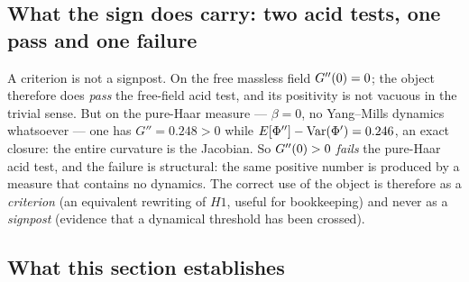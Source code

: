 
\subsection{What the sign does carry: two acid tests, one pass and one failure}

A criterion is not a signpost. On the free massless field $G''(0)=0$; the object therefore does
\emph{pass} the free-field acid test, and its positivity is not vacuous in the trivial sense.
\LT{} But on the pure-Haar measure --- $\beta=0$, no Yang--Mills dynamics whatsoever --- one has
$G''=0.248>0$ while $E[\Phi'']-\operatorname{Var}(\Phi')=0.246$, an exact closure: the entire curvature is the
Jacobian. \LT{} So $G''(0)>0$ \emph{fails} the pure-Haar acid test, and the failure is structural:
the same positive number is produced by a measure that contains no dynamics. The correct use of
the object is therefore as a \emph{criterion} (an equivalent rewriting of $H1$, useful for
bookkeeping) and never as a \emph{signpost} (evidence that a dynamical threshold has been
crossed).


\subsection{What this section establishes}

